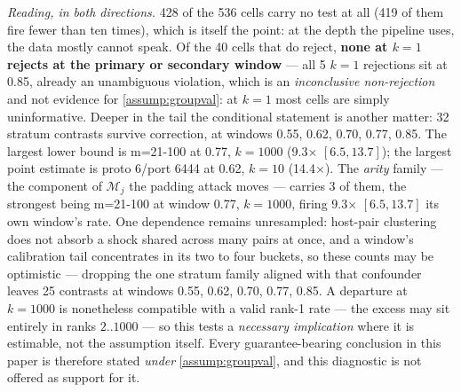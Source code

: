 \emph{Reading, in both directions.} 428 of the 536 cells carry no test at all
(419 of them fire fewer than ten times), which is itself the point: at the depth the pipeline
uses, the data mostly cannot speak. Of the 40 cells that do reject, \textbf{none at $k{=}1$ rejects at the primary or secondary window} --- all 5 $k{=}1$ rejections sit at 0.85, already an unambiguous violation,
which is an \emph{inconclusive non-rejection} and not evidence for \cref{assump:groupval}: at
$k{=}1$ most cells are simply uninformative. Deeper in the tail the conditional statement is
another matter: 32 stratum contrasts survive correction, at windows 0.55, 0.62, 0.70, 0.77, 0.85. The largest lower bound is m=21-100 at 0.77, $k{=}1000$ (9.3$\times$ $[6.5,13.7]$); the largest point estimate is proto 6/port 6444 at 0.62, $k{=}10$ (14.4$\times$). The \emph{arity} family --- the component of $\mathcal{M}_j$ the padding attack moves --- carries 3 of them, the strongest being m=21-100 at window 0.77, $k{=}1000$, firing 9.3$\times$ $[6.5,13.7]$ its own window's rate. One dependence remains unresampled: host-pair clustering does not
absorb a shock shared across many pairs at once, and a window's calibration tail concentrates in its
two to four buckets, so these counts may be optimistic --- dropping the one stratum family aligned
with that confounder leaves 25 contrasts at windows 0.55, 0.62, 0.70, 0.77, 0.85. A departure at
$k{=}1000$ is nonetheless compatible with a valid rank-1 rate --- the excess may sit entirely in
ranks $2..1000$ --- so this tests a \emph{necessary implication} where it is estimable, not the
assumption itself. Every guarantee-bearing conclusion in this paper is therefore stated \emph{under}
\cref{assump:groupval}, and this diagnostic is not offered as support for it.
